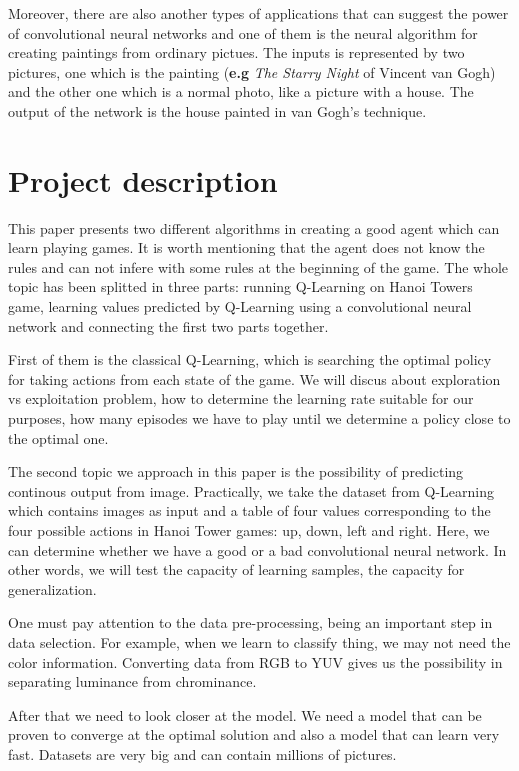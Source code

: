 Moreover, there are also another types of applications that can suggest the power of convolutional neural networks and one of them is the neural algorithm for creating paintings\cite{paintings} from ordinary pictues. The inputs is represented by two pictures, one which is the painting (\textbf{e.g} \textit{The Starry Night} of Vincent van Gogh) and the other one which is a normal photo, like a picture with a house. The output of the network is the house painted in van Gogh's technique.


\section{Project description}
\label{sec:proj-description}
This paper presents two different algorithms in creating a good agent which can learn playing games. It is worth mentioning that the agent does not know the rules and can not infere with some rules at the beginning of the game. The whole topic has been splitted in three parts: running Q-Learning on Hanoi Towers game, learning values predicted by Q-Learning using a convolutional neural network and connecting the first two parts together.

First of them is the classical Q-Learning, which is searching the optimal policy for taking actions from each state of the game. We will discus about exploration vs exploitation problem, how to determine the learning rate suitable for our purposes, how many episodes we have to play until we determine a policy close to the optimal one.

The second topic we approach in this paper is the possibility of predicting continous output from image. Practically, we take the dataset from Q-Learning which contains images as input and a table of four values corresponding to the four possible actions in Hanoi Tower games: up, down, left and right.
Here, we can determine whether we have a good or a bad convolutional neural network. In other words, we will test the capacity of learning samples, the capacity for generalization.

One must pay attention to the data pre-processing, being an important step in data selection. For example, when we learn to classify thing, we may not need the color information. Converting data from RGB to YUV gives us the possibility in separating luminance from chrominance.

After that we need to look closer at the model. We need a model that can be proven to converge at the optimal solution and also a model that can learn very fast. Datasets are very big and can contain millions of pictures.

